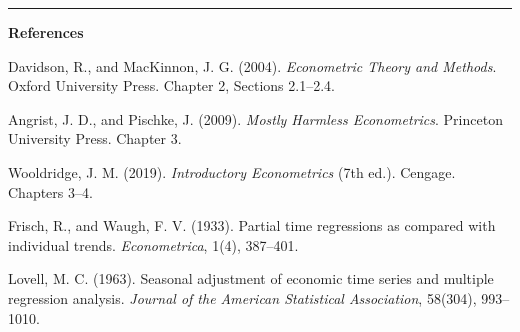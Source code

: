 \medskip\hrule\medskip

\textbf{References}

Davidson, R., and MacKinnon, J. G. (2004). \textit{Econometric Theory and Methods}. Oxford University Press. Chapter 2, Sections 2.1--2.4.

Angrist, J. D., and Pischke, J. (2009). \textit{Mostly Harmless Econometrics}. Princeton University Press. Chapter 3.

Wooldridge, J. M. (2019). \textit{Introductory Econometrics} (7th ed.). Cengage. Chapters 3--4.

Frisch, R., and Waugh, F. V. (1933). Partial time regressions as compared with individual trends. \textit{Econometrica}, 1(4), 387--401.

Lovell, M. C. (1963). Seasonal adjustment of economic time series and multiple regression analysis. \textit{Journal of the American Statistical Association}, 58(304), 993--1010.

